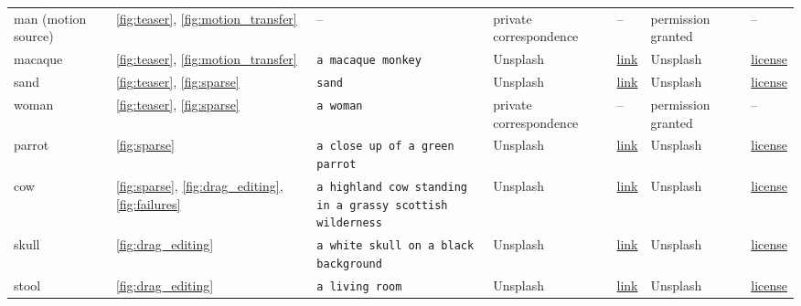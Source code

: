 \begin{table}[t]
\begin{center}
{\begin{tabular}{@{\hspace{3mm}}lllllll}
    man (motion source) & \cref{fig:teaser}, \cref{fig:motion_transfer} & \;-- & private correspondence & \;-- & permission granted & \;-- \\ \cmidrule(lr){1-7}
    
    macaque & \cref{fig:teaser}, \cref{fig:motion_transfer} & \texttt{a macaque monkey} & Unsplash & \href{https://unsplash.com/photos/shallow-focus-photography-of-monkey-ghD1Znf8gps}{link} & Unsplash & \href{https://unsplash.com/license}{license} \\ \cmidrule(lr){1-7}
    
    sand & \cref{fig:teaser}, \cref{fig:sparse} & \texttt{sand} & Unsplash & \href{https://unsplash.com/photos/focus-photo-of-brown-sand-eYWNaMffWHI}{link} & Unsplash & \href{https://unsplash.com/license}{license} \\ \cmidrule(lr){1-7}
    
    woman & \cref{fig:teaser}, \cref{fig:sparse} & \texttt{a woman} & private correspondence & \;-- & permission granted & \;-- \\ \cmidrule(lr){1-7}
    
    parrot & \cref{fig:sparse} & \texttt{a close up of a green parrot} & Unsplash & \href{https://unsplash.com/photos/a-close-up-of-a-green-parrot-with-a-red-beak-uhEwDYq0iM0}{link} & Unsplash & \href{https://unsplash.com/license}{license} \\ \cmidrule(lr){1-7}
    
    cow & \cref{fig:sparse}, \cref{fig:drag_editing}, \cref{fig:failures} & \makecell[l]{\texttt{a highland cow standing} \\ \texttt{in a grassy scottish wilderness}} & Unsplash & \href{https://unsplash.com/photos/a-long-haired-cow-standing-on-top-of-a-grass-covered-field-qiQmvXnQ_SE}{link} & Unsplash & \href{https://unsplash.com/license}{license} \\ \cmidrule(lr){1-7}
    
    skull & \cref{fig:drag_editing} & \texttt{a white skull on a black background} & Unsplash & \href{https://unsplash.com/photos/a-skeleton-is-standing-in-a-black-and-white-photo-B5Ddx7kx8yk}{link} & Unsplash & \href{https://unsplash.com/license}{license} \\ \cmidrule(lr){1-7}
    
    stool & \cref{fig:drag_editing} & \texttt{a living room} & Unsplash & \href{https://unsplash.com/photos/turned-off-flat-screen-television-on-white-dresser-dv9AoOYegRc}{link} & Unsplash & \href{https://unsplash.com/license}{license} \\ \cmidrule(lr){1-7}
    

\end{tabular}}
\end{center}
\end{table}
